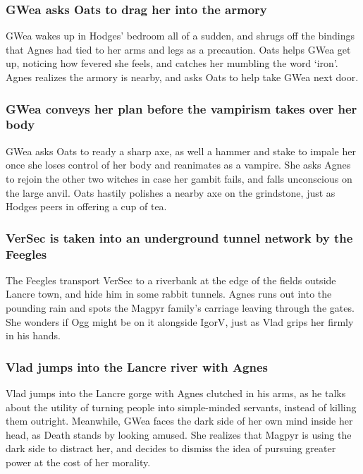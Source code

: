 \subsubsection{\Gls{GWea} asks \Gls{Oats} to drag her into the armory}
\Gls{GWea} wakes up in \Gls{Hodges}' bedroom all of a sudden, and shrugs off the bindings that
\Gls{Agnes} had tied to her arms and legs as a precaution. \Gls{Oats} helps \Gls{GWea} get up,
noticing how fevered she feels, and catches her mumbling the word `iron'. \Gls{Agnes} realizes the
armory is nearby, and asks \Gls{Oats} to help take \Gls{GWea} next door.

\subsubsection{\Gls{GWea} conveys her plan before the vampirism takes over her body}
\Gls{GWea} asks \Gls{Oats} to ready a sharp axe, as well a hammer and stake to impale her once she
loses control of her body and reanimates as a vampire. She asks \Gls{Agnes} to rejoin the other
two witches in case her gambit fails, and falls unconscious on the large anvil. \Gls{Oats} hastily
polishes a nearby axe on the grindstone, just as \Gls{Hodges} peers in offering a cup of tea.

\subsubsection{\Gls{VerSec} is taken into an underground tunnel network by the Feegles}
The Feegles transport \Gls{VerSec} to a riverbank at the edge of the fields outside Lancre town,
and hide him in some rabbit tunnels. \Gls{Agnes} runs out into the pounding rain and spots the
Magpyr family's carriage leaving through the gates. She wonders if \Gls{Ogg} might be on it
alongside \Gls{IgorV}, just as \Gls{Vlad} grips her firmly in his hands.

\subsubsection{\Gls{Vlad} jumps into the Lancre river with \Gls{Agnes}}
\Gls{Vlad} jumps into the Lancre gorge with \Gls{Agnes} clutched in his arms, as he talks about the
utility of turning people into simple-minded servants, instead of killing them outright. Meanwhile,
\Gls{GWea} faces the dark side of her own mind inside her head, as \Gls{Death} stands by looking
amused. She realizes that \Gls{Magpyr} is using the dark side to distract her, and decides to
dismiss the idea of pursuing greater power at the cost of her morality.

